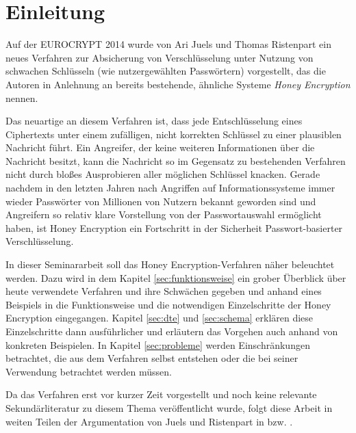 \section{Einleitung}

Auf der EUROCRYPT 2014 wurde von Ari Juels und Thomas Ristenpart ein neues Verfahren zur Absicherung von Verschlüsselung unter Nutzung von schwachen Schlüsseln (wie nutzergewählten Passwörtern) vorgestellt, das die Autoren in Anlehnung an bereits bestehende, ähnliche Systeme \emph{Honey Encryption} nennen. 

Das neuartige an diesem Verfahren ist, dass jede Entschlüsselung eines Ciphertexts unter einem zufälligen, nicht korrekten Schlüssel zu einer plausiblen Nachricht führt. Ein Angreifer, der keine weiteren Informationen über die Nachricht besitzt, kann die Nachricht so im Gegensatz zu bestehenden Verfahren nicht durch bloßes Ausprobieren aller möglichen Schlüssel knacken. Gerade nachdem in den letzten Jahren nach Angriffen auf Informationssysteme immer wieder Passwörter von Millionen von Nutzern bekannt geworden sind und Angreifern so relativ klare Vorstellung von der Passwortauswahl ermöglicht haben, ist Honey Encryption ein Fortschritt in der Sicherheit Passwort-basierter Verschlüsselung.

In dieser Seminararbeit soll das Honey Encryption-Verfahren näher beleuchtet werden. Dazu wird in dem Kapitel \ref{sec:funktionsweise} ein grober Überblick über heute verwendete Verfahren und ihre Schwächen gegeben und anhand eines Beispiels in die Funktionsweise und die notwendigen Einzelschritte der Honey Encryption eingegangen. Kapitel \ref{sec:dte} und \ref{sec:schema} erklären diese Einzelschritte dann ausführlicher und erläutern das Vorgehen auch anhand von konkreten Beispielen. In Kapitel \ref{sec:probleme} werden Einschränkungen betrachtet, die aus dem Verfahren selbst entstehen oder die bei seiner Verwendung betrachtet werden müssen.

Da das Verfahren erst vor kurzer Zeit vorgestellt und noch keine relevante Sekundärliteratur zu diesem Thema veröffentlicht wurde, folgt diese Arbeit in weiten Teilen der Argumentation von Juels und Ristenpart in \cite{EURO2014} bzw. \cite{IEEE2014}. 
\newpage